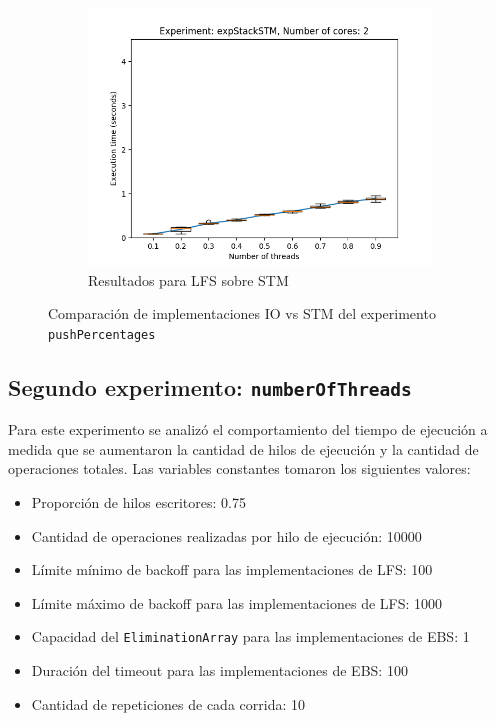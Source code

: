 \begin{figure}[H]
\begin{subfigure}[b]{0.49\textwidth}
        \includegraphics[width=\textwidth]{images/pushPercentages/plots/expStackSTM-2}
        \caption{Resultados para LFS sobre STM}
        \label{subfig:pushPercentages-stackstm-2}
    \end{subfigure}
    \caption{Comparación de implementaciones IO vs STM del experimento \texttt{pushPercentages}}
    \label{fig:pushPercentages-boxplots}
\end{figure}

\clearpage
\subsection{Segundo experimento: \texttt{numberOfThreads}}\label{subsec:numberOfThreads}
Para este experimento se analizó el comportamiento del tiempo de ejecución a medida que se aumentaron la cantidad de hilos de ejecución y la cantidad de operaciones totales.
Las variables constantes tomaron los siguientes valores:

\begin{itemize}
    \item Proporción de hilos escritores: 0.75
    \item Cantidad de operaciones realizadas por hilo de ejecución: 10000
    \item Límite mínimo de backoff para las implementaciones de LFS: 100
    \item Límite máximo de backoff para las implementaciones de LFS: 1000
    \item Capacidad del \texttt{EliminationArray} para las implementaciones de EBS: 1
    \item Duración del timeout para las implementaciones de EBS: 100
    \item Cantidad de repeticiones de cada corrida: 10
\end{itemize}

